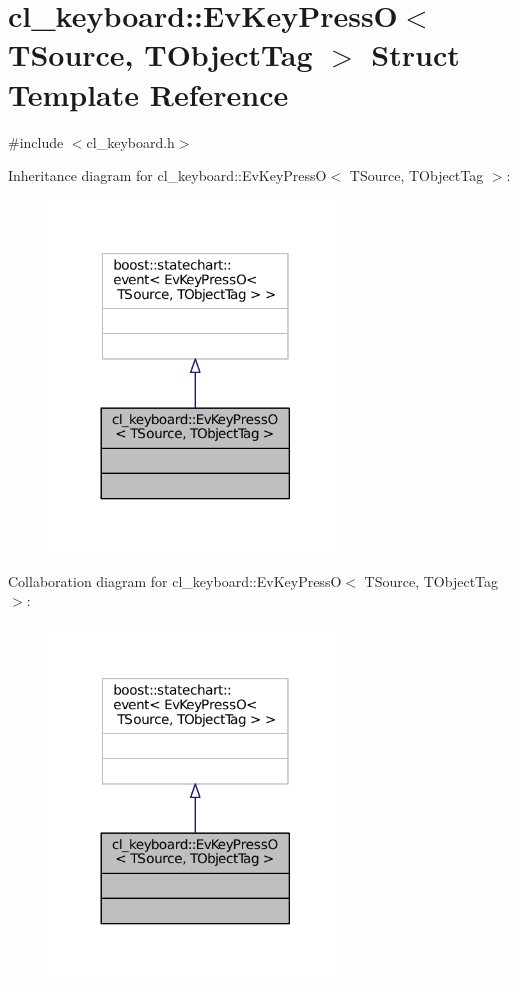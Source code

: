 \hypertarget{structcl__keyboard_1_1EvKeyPressO}{}\section{cl\+\_\+keyboard\+:\+:Ev\+Key\+PressO$<$ T\+Source, T\+Object\+Tag $>$ Struct Template Reference}
\label{structcl__keyboard_1_1EvKeyPressO}


{\ttfamily \#include $<$cl\+\_\+keyboard.\+h$>$}



Inheritance diagram for cl\+\_\+keyboard\+:\+:Ev\+Key\+PressO$<$ T\+Source, T\+Object\+Tag $>$\+:
\nopagebreak
\begin{figure}[H]
\begin{center}
\leavevmode
\includegraphics[width=221pt]{structcl__keyboard_1_1EvKeyPressO__inherit__graph}
\end{center}
\end{figure}


Collaboration diagram for cl\+\_\+keyboard\+:\+:Ev\+Key\+PressO$<$ T\+Source, T\+Object\+Tag $>$\+:
\nopagebreak
\begin{figure}[H]
\begin{center}
\leavevmode
\includegraphics[width=221pt]{structcl__keyboard_1_1EvKeyPressO__coll__graph}
\end{center}
\end{figure}


